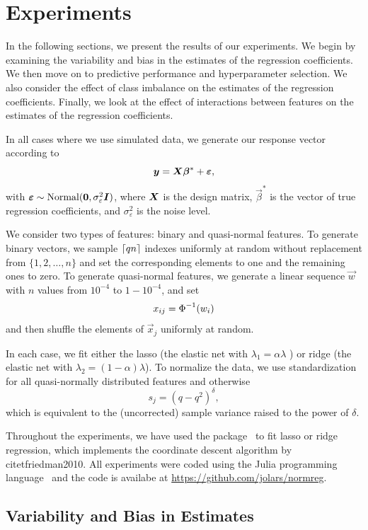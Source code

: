 \section{Experiments}
\label{sec:experiments}

In the following sections, we present the results of our experiments. We begin by examining the variability and bias in the estimates of the regression coefficients. We then move on to predictive performance and hyperparameter selection. We also consider the effect of class imbalance on the estimates of the regression coefficients. Finally, we look at the effect of interactions between features on the estimates of the regression coefficients.

In all cases where we use simulated data, we generate our response vector according to
\[
  \boldsymbol{y} = \boldsymbol{X}\boldsymbol{\beta}^* + \boldsymbol{\varepsilon},
\]
with \(\boldsymbol{\varepsilon} \sim \operatorname{Normal}(\boldsymbol{0}, \sigma_\varepsilon^2 \boldsymbol{I})\), where \(\boldsymbol{X}\) is the design matrix, \(\vec{\beta}^*\) is the vector of true regression coefficients, and \(\sigma_\varepsilon^2\) is the noise level.

We consider two types of features: binary and quasi-normal features.
To generate binary vectors, we sample \(\lceil qn \rceil\) indexes uniformly at random without replacement from \(\{1,2,\dots,n\}\) and set the corresponding elements to one and the remaining ones to zero.
To generate quasi-normal features, we generate a linear sequence \(\vec{w}\) with \(n\) values from  \(10^{-4}\) to \(1 - 10^{-4}\), and set
\[
  x_{ij} = \operatorname{\Phi}^{-1}(w_i)
\]
and then shuffle the elements of \(\vec{x}_j\) uniformly at random.

In each case, we fit either the lasso (the elastic net with \(\lambda_1 = \alpha \lambda\) ) or ridge (the elastic net with \(\lambda_2 = (1 - \alpha)\lambda\)). To normalize the data, we use
standardization for all quasi-normally distributed features and otherwise
\[
  s_j = (q - q^2)^\delta,
\]
which is equivalent to the (uncorrected) sample variance raised to the power of \(\delta\).

Throughout the experiments, we have used the  package~\citep{kornblith2024} to fit lasso or ridge regression, which implements the coordinate descent algorithm by citet{friedman2010}. All experiments were coded using the Julia programming language~\citep{bezanson2017} and the code is availabe at \url{https://github.com/jolars/normreg}.

\subsection{Variability and Bias in Estimates}\label{sec:experiments-varbias}


